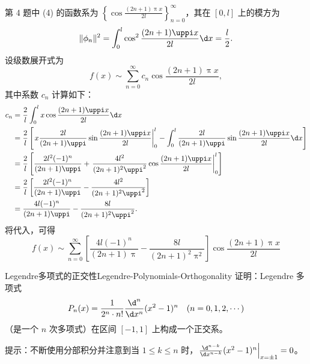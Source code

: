 \begin{solution}
    第 4 题中 (4) 的函数系为 $\left\{ \cos \frac{(2n+1)\uppi x}{2l} \right\}_{n=0}^{\infty}$，其在 $[0, l]$ 上的模方为
    \begin{equation}\label{eq:norm-6}
        \|\phi_n\|^2 = \int_{0}^{l} \cos^2 \frac{(2n+1)\uppi x}{2l} \d x = \frac{l}{2}.
    \end{equation}
    设级数展开式为
    \begin{equation}\label{eq:series-6}
        f(x) \sim \sum_{n=0}^{\infty} c_n \cos \frac{(2n+1)\uppi x}{2l},
    \end{equation}
    其中系数 $c_n$ 计算如下：
    \begin{equation}\label{eq:coeff-6}
        \begin{aligned}
            c_n & = \frac{2}{l} \int_{0}^{l} x \cos \frac{(2n+1)\uppi x}{2l} \d x                                                                                                                     \\
                & = \frac{2}{l} \left[ \left. x \frac{2l}{(2n+1)\uppi} \sin \frac{(2n+1)\uppi x}{2l} \right|_{0}^{l} - \int_{0}^{l} \frac{2l}{(2n+1)\uppi} \sin \frac{(2n+1)\uppi x}{2l} \d x \right] \\
                & = \frac{2}{l} \left[ \frac{2l^2(-1)^n}{(2n+1)\uppi} + \left. \frac{4l^2}{(2n+1)^2\uppi^2} \cos \frac{(2n+1)\uppi x}{2l} \right|_{0}^{l} \right]                                     \\
                & = \frac{2}{l} \left[ \frac{2l^2(-1)^n}{(2n+1)\uppi} - \frac{4l^2}{(2n+1)^2\uppi^2} \right]                                                                                          \\
                & = \frac{4l(-1)^n}{(2n+1)\uppi} - \frac{8l}{(2n+1)^2\uppi^2}.
        \end{aligned}
    \end{equation}
    将代入，可得
    \begin{equation}
        \boxed{f(x) \sim \sum_{n=0}^{\infty} \left[ \frac{4l(-1)^n}{(2n+1)\uppi} - \frac{8l}{(2n+1)^2\uppi^2} \right] \cos \frac{(2n+1)\uppi x}{2l}}
    \end{equation}
\end{solution}

\begin{problem}{Legendre多项式的正交性}{Legendre-Polynomials-Orthogonality}
    证明：Legendre 多项式
    \begin{equation}\label{eq:legendre-def-7}
        P_n(x) = \frac{1}{2^n \cdot n!} \frac{\d^n}{\d x^n} (x^2 - 1)^n \quad (n = 0, 1, 2, \cdots)
    \end{equation}
    （是一个 $n$ 次多项式）在区间 $[-1, 1]$ 上构成一个正交系。

    提示：不断使用分部积分并注意到当 $1 \leqslant k \leqslant n$ 时，$\left. \frac{\d^{n-k}}{\d x^{n-k}} (x^2 - 1)^n \right|_{x=\pm 1} = 0$。
\end{problem}

